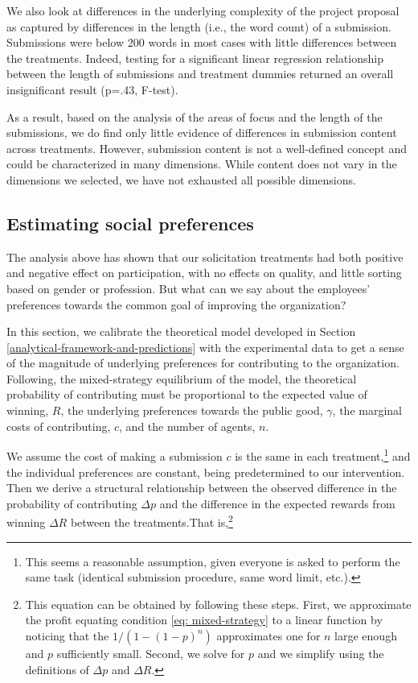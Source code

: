 \documentclass[12pt, titlepage]{article}
\begin{document}
We also look at differences in the underlying complexity of the project
proposal as captured by differences in the length (i.e., the word count)
of a submission. Submissions were below 200 words in most cases with
little differences between the treatments. Indeed, testing for a
significant linear regression relationship between the length of
submissions and treatment dummies returned an overall insignificant
result (p=.43, F-test).

As a result, based on the analysis of the areas of focus and the length
of the submissions, we do find only little evidence of differences in
submission content across treatments. However, submission content is not
a well-defined concept and could be characterized in many dimensions.
While content does not vary in the dimensions we selected, we have not
exhausted all possible dimensions.

\subsection{Estimating social
preferences}\label{estimating-social-preferences}

The analysis above has shown that our solicitation treatments had both
positive and negative effect on participation, with no effects on
quality, and little sorting based on gender or profession. But what can
we say about the employees' preferences towards the common goal of
improving the organization?

In this section, we calibrate the theoretical model developed in Section
\ref{analytical-framework-and-predictions} with the experimental data to
get a sense of the magnitude of underlying preferences for contributing
to the organization. Following, the mixed-strategy equilibrium of the
model, the theoretical probability of contributing must be proportional
to the expected value of winning, \(R\), the underlying preferences
towards the public good, \(\gamma\), the marginal costs of contributing,
\(c\), and the number of agents, \(n\).

We assume the cost of making a submission \(c\) is the same in each
treatment,\footnote{This seems a reasonable assumption, given everyone
  is asked to perform the same task (identical submission procedure,
  same word limit, etc.).} and the individual preferences are constant,
being predetermined to our intervention. Then we derive a structural
relationship between the observed difference in the probability of
contributing \(\Delta p\) and the difference in the expected rewards
from winning \(\Delta R\) between the treatments.That is,\footnote{This
  equation can be obtained by following these steps. First, we
  approximate the profit equating condition \eqref{eq: mixed-strategy}
  to a linear function by noticing that the \(1/(1-(1-p)^n)\)
  approximates one for \(n\) large enough and \(p\) sufficiently small.
  Second, we solve for \(p\) and we simplify using the definitions of
  \(\Delta p\) and \(\Delta R\).}
\end{document}
